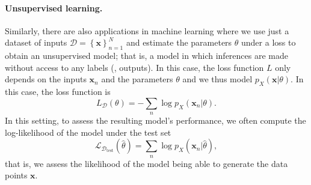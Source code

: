 \paragraph*{Unsupervised learning.} Similarly, there are also applications in machine learning where we use just a
dataset of inputs $\mathcal D = \left\{\bm{x}\right\}_{n=1}^N$ and estimate the parameters $\theta$ under a loss to
obtain an unsupervised model; that is, a model in which inferences are made
without access to any labels (\ie, outputs). In this case, the loss function $L$ only
depends on the inputs $\bm{x}_n$ and the parameters $\theta$
and we thus model $p_X(\bm{x}|\theta)$.
In this case, the loss function is
%
\begin{equation}
    L_\mathcal{D}\left(\theta\right)=-\sum_n\log p_X\left(\bm{x}_n|\theta\right).
\end{equation}
%
In this setting, to assess the resulting model's performance,
we often compute the log-likelihood of the model under the test set
%
\begin{equation}
    \mathcal{L}_{\mathcal{D}_\text{test}}(\hat{\theta}) =
    \sum_n\log p_X\left(\bm{x}_n|\hat{\theta}\right),
\end{equation}
%
that is, we assess the likelihood of the model being able to generate
the data points $\bm{x}$.

